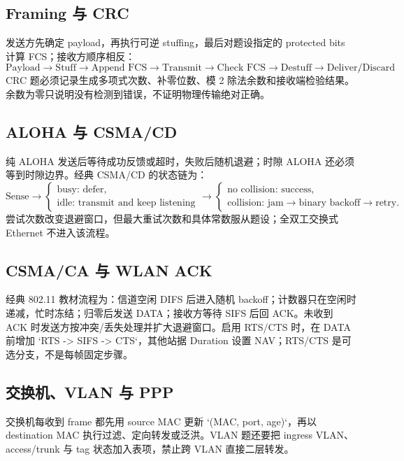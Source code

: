 \documentclass[UTF8,fontset=none,11pt,a4paper]{ctexart}
\begin{document}
\subsection{Framing 与 CRC}

发送方先确定 payload，再执行可逆 stuffing，最后对题设指定的 protected bits 计算 FCS；接收方顺序相反：
\[
\boxed{\text{Payload}\to\text{Stuff}\to\text{Append FCS}\to\text{Transmit}
\to\text{Check FCS}\to\text{Destuff}\to\text{Deliver/Discard}}.
\]
CRC 题必须记录生成多项式次数、补零位数、模 2 除法余数和接收端检验结果。余数为零只说明没有检测到错误，不证明物理传输绝对正确。

\subsection{ALOHA 与 CSMA/CD}

纯 ALOHA 发送后等待成功反馈或超时，失败后随机退避；时隙 ALOHA 还必须等到时隙边界。经典 CSMA/CD 的状态链为：
\[
\text{Sense}\to
\begin{cases}
\text{busy: defer},\\
\text{idle: transmit and keep listening}
\end{cases}
\to
\begin{cases}
\text{no collision: success},\\
\text{collision: jam}\to\text{binary backoff}\to\text{retry}.
\end{cases}
\]
尝试次数改变退避窗口，但最大重试次数和具体常数服从题设；全双工交换式 Ethernet 不进入该流程。

\subsection{CSMA/CA 与 WLAN ACK}

经典 802.11 教材流程为：信道空闲 DIFS 后进入随机 backoff；计数器只在空闲时递减，忙时冻结；归零后发送 DATA；接收方等待 SIFS 后回 ACK。未收到 ACK 时发送方按冲突/丢失处理并扩大退避窗口。启用 RTS/CTS 时，在 DATA 前增加 `RTS -> SIFS -> CTS`，其他站据 Duration 设置 NAV；RTS/CTS 是可选分支，不是每帧固定步骤。

\subsection{交换机、VLAN 与 PPP}

交换机每收到 frame 都先用 source MAC 更新 `(MAC, port, age)`，再以 destination MAC 执行过滤、定向转发或泛洪。VLAN 题还要把 ingress VLAN、access/trunk 与 tag 状态加入表项，禁止跨 VLAN 直接二层转发。
\end{document}
